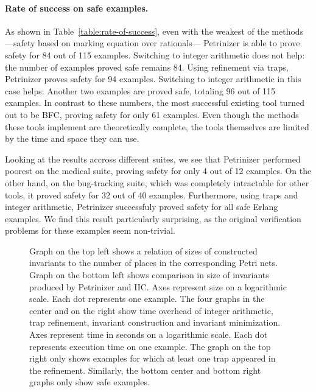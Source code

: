 \paragraph{Rate of success on safe examples.}
As shown in Table~\ref{table:rate-of-success}, even with the weakest of the
methods ---safety based on marking equation over rationals--- Petrinizer is
able to prove safety for 84 out
of 115 examples. Switching to integer arithmetic does not help: the number of
examples proved safe remains 84. 
Using refinement via traps, Petrinizer proves
safety for 94 examples. Switching to integer arithmetic in this case helps:
Another two examples are proved safe, totaling 96 out of 115 examples. 
In contrast to these numbers, the most successful existing tool turned out to be BFC, proving safety for
only 61 examples. 
Even though the methods these tools implement
are theoretically complete, the tools themselves are limited by the time and space they can
use.

Looking at the results accross different suites, we see that Petrinizer
performed poorest on the medical suite, proving safety for only 4 out of 12
examples. On the other hand, on the bug-tracking suite, which was completely
intractable for other tools, it proved safety for 32 out of 40 examples.
Furthermore, using traps and integer arithmetic, Petrinizer successfuly proved
safety for all safe Erlang examples. We find this result particularly
surprising, as the original verification problems for these examples seem non-trivial.

\begin{figure}[t]
  \centering
  
  \caption[Invariant sizes and time overhead of Petrinizer options.]{Graph on the top left shows a relation of sizes of constructed
  invariants to the number of places in the corresponding Petri nets. Graph
  on the bottom left shows comparison in size of invariants produced by Petrinizer and
  IIC\@. Axes represent size on a logarithmic scale. Each dot represents
  one example.
  The four graphs in the center and on the right show time
  overhead of integer arithmetic, trap refinement, invariant
  construction and invariant minimization. Axes represent time in
  seconds on a logarithmic scale. Each dot represents execution time
  on one example. The graph on the top right only shows examples for
  which at least one trap appeared in the refinement. Similarly, the
  bottom center and bottom right graphs only show safe examples.}
\label{fig:petrinizer-various}
\end{figure}

